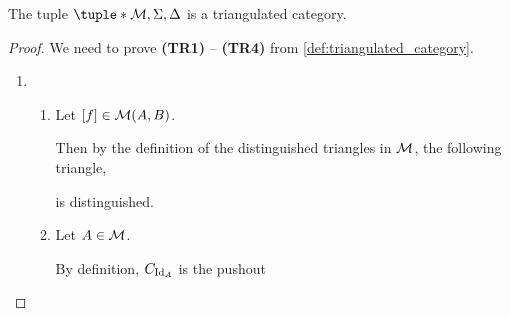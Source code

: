 \begin{example}
    \label{example:stable_module_category_triangulated}
    The tuple \( \tuple*{\Mc, \Sigma, \Delta} \) is a triangulated category.
\end{example}
\begin{proof} %
    We need to prove {\bf (TR1)} -- {\bf (TR4)} from \autoref{def:triangulated_category}.
    \begin{enumerate}[label={(\bfseries TR\arabic*)}]
        \item {
            \begin{enumerate}
                \item {
                    Let \( [f] \in {\mathcal{M}}(A, B) \).
                    
                    Then by the definition of the distinguished triangles in \( {\mathcal{M}} \), the following triangle,
                    \begin{center}
                    \end{center}
                    is distinguished.
                }
                \item {
                    Let \( A \in {\mathcal{M}} \).
                    
                    By definition, \( C_{\operatorname{Id}_A} \) is the pushout
                    \begin{center}
\end{center}}
\end{enumerate}}
\end{enumerate}
\end{proof}
